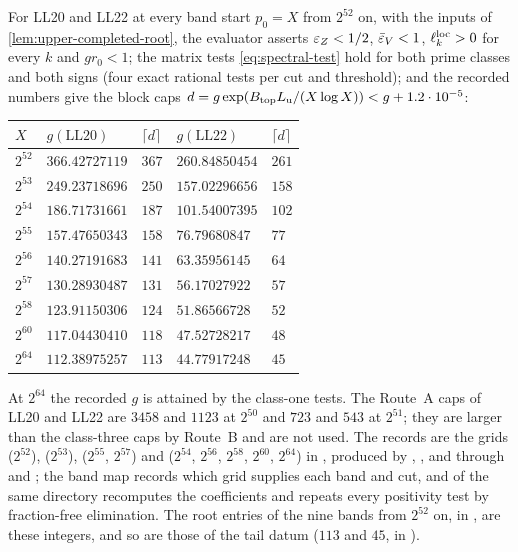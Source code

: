\begin{certificate}\label{cert:upper-completed-root}
For LL20 and LL22 at every band start $p_0=X$ from $2^{52}$ on, with the inputs of
\cref{lem:upper-completed-root}, the evaluator asserts $\varepsilon_Z<1/2$,
$\bar{\varepsilon}_V<1$, $\ell^{\rm loc}_k>0$ for every $k$ and $gr_0<1$; the matrix tests
\eqref{eq:spectral-test} hold for both prime classes and both signs (four exact
rational tests per cut and threshold); and the recorded numbers give the block caps
$d=g\exp(B_{\rm top}L_{\rm u}/(X\log X))<g+1.2\cdot10^{-5}$:
\begin{center}
\small
\begin{tabular}{@{}lllll@{}}
\toprule
$X$ & $g(\mathrm{LL20})$ & $\lceil d\rceil$ & $g(\mathrm{LL22})$ & $\lceil d\rceil$\\
\midrule
$2^{52}$ & $366.42727119$ & $367$ & $260.84850454$ & $261$\\
$2^{53}$ & $249.23718696$ & $250$ & $157.02296656$ & $158$\\
$2^{54}$ & $186.71731661$ & $187$ & $101.54007395$ & $102$\\
$2^{55}$ & $157.47650343$ & $158$ & $76.79680847$ & $77$\\
$2^{56}$ & $140.27191683$ & $141$ & $63.35956145$ & $64$\\
$2^{57}$ & $130.28930487$ & $131$ & $56.17027922$ & $57$\\
$2^{58}$ & $123.91150306$ & $124$ & $51.86566728$ & $52$\\
$2^{60}$ & $117.04430410$ & $118$ & $47.52728217$ & $48$\\
$2^{64}$ & $112.38975257$ & $113$ & $44.77917248$ & $45$\\
\bottomrule
\end{tabular}
\end{center}
At $2^{64}$ the recorded $g$ is attained by the class-one tests. The
Route~A caps of LL20 and LL22 are $3458$ and $1123$ at $2^{50}$ and $723$ and $543$ at
$2^{51}$; they are larger than the class-three caps by Route~B and are not used. The records are the grids
 ($2^{52}$),  ($2^{53}$),
 ($2^{55}$, $2^{57}$) and 
($2^{54}$, $2^{56}$, $2^{58}$, $2^{60}$, $2^{64}$) in
, produced by ,
,  and
 through  and
; the band map
 records which
grid supplies each band and cut, and  of the same
directory recomputes the coefficients and repeats every positivity test by
fraction-free elimination. The root entries of the nine bands from $2^{52}$ on, in
, are these
integers, and so are those of the tail datum ($113$ and $45$, in
).
\end{certificate}

